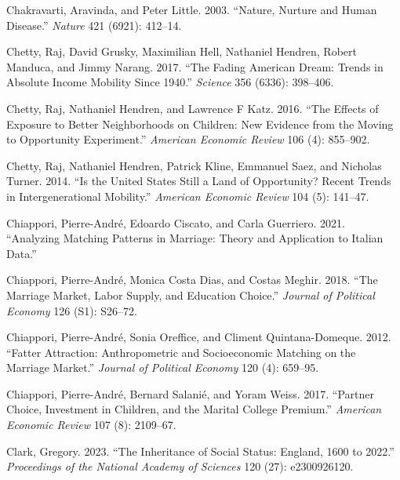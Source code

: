 \documentclass[
  12pt,
]{article}
\newlength{\cslhangindent}
\newlength{\cslentryspacingunit} %
\newenvironment{CSLReferences}[2] %
 {%
  \setlength{\parindent}{0pt}
  \ifodd #1
  \let\oldpar\par
  \def\par{\hangindent=\cslhangindent\oldpar}
  \fi
  \setlength{\parskip}{#2\cslentryspacingunit}
 }%
 {}
\theoremstyle{definition}
\theoremstyle{definition}
\theoremstyle{definition}
\theoremstyle{definition}
\theoremstyle{remark}
\begin{document}
\begin{CSLReferences}{1}{0}
\leavevmode{}%
Chakravarti, Aravinda, and Peter Little. 2003. {``Nature, Nurture and Human Disease.''} \emph{Nature} 421 (6921): 412--14.

\leavevmode{}%
Chetty, Raj, David Grusky, Maximilian Hell, Nathaniel Hendren, Robert Manduca, and Jimmy Narang. 2017. {``The Fading American Dream: Trends in Absolute Income Mobility Since 1940.''} \emph{Science} 356 (6336): 398--406.

\leavevmode{}%
Chetty, Raj, Nathaniel Hendren, and Lawrence F Katz. 2016. {``The Effects of Exposure to Better Neighborhoods on Children: New Evidence from the Moving to Opportunity Experiment.''} \emph{American Economic Review} 106 (4): 855--902.

\leavevmode{}%
Chetty, Raj, Nathaniel Hendren, Patrick Kline, Emmanuel Saez, and Nicholas Turner. 2014. {``Is the United States Still a Land of Opportunity? Recent Trends in Intergenerational Mobility.''} \emph{American Economic Review} 104 (5): 141--47.

\leavevmode{}%
Chiappori, Pierre-André, Edoardo Ciscato, and Carla Guerriero. 2021. {``Analyzing Matching Patterns in Marriage: Theory and Application to Italian Data.''}

\leavevmode{}%
Chiappori, Pierre-André, Monica Costa Dias, and Costas Meghir. 2018. {``The Marriage Market, Labor Supply, and Education Choice.''} \emph{Journal of Political Economy} 126 (S1): S26--72.

\leavevmode{}%
Chiappori, Pierre-André, Sonia Oreffice, and Climent Quintana-Domeque. 2012. {``Fatter Attraction: Anthropometric and Socioeconomic Matching on the Marriage Market.''} \emph{Journal of Political Economy} 120 (4): 659--95.

\leavevmode{}%
Chiappori, Pierre-André, Bernard Salanié, and Yoram Weiss. 2017. {``Partner Choice, Investment in Children, and the Marital College Premium.''} \emph{American Economic Review} 107 (8): 2109--67.

\leavevmode{}%
Clark, Gregory. 2023. {``The Inheritance of Social Status: England, 1600 to 2022.''} \emph{Proceedings of the National Academy of Sciences} 120 (27): e2300926120.


\end{CSLReferences}
\end{document}
